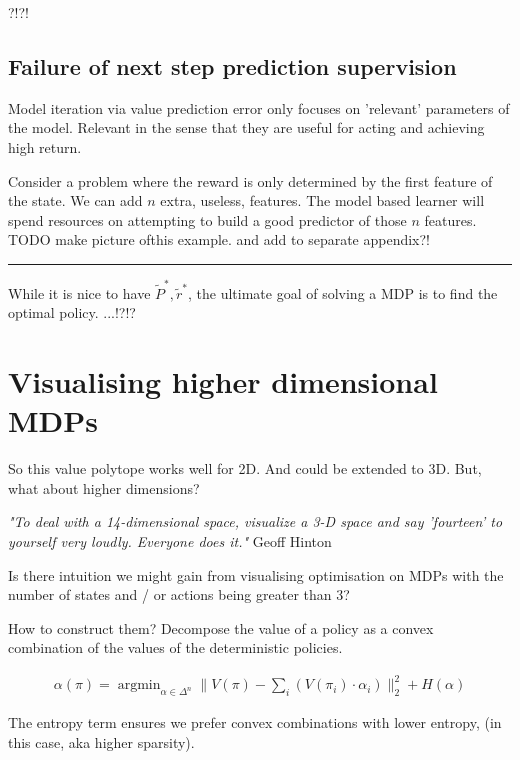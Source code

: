 ?!?!

\subsection{Failure of next step prediction supervision}

Model iteration via value prediction error only focuses on 'relevant' parameters of the model.
Relevant in the sense that they are useful for acting and achieving high return.

Consider a problem where the reward is only determined by the first feature of the state. We can add $n$ extra, useless, features.
The model based learner will spend resources on attempting to build a good predictor of those $n$ features.
{\color{red} TODO make picture ofthis example. and add to separate appendix?!}


\begin{center}\rule{0.5\linewidth}{\linethickness}\end{center}

While it is nice to have $\tilde P^{* }, \tilde r^{* }$, the ultimate goal of
solving a MDP is to find the optimal policy. ...!?!?

\newpage
\section{Visualising higher dimensional MDPs}\label{graph-vis}

So this value polytope works well for 2D. And could be extended to 3D. But, what about higher dimensions?

\begin{displayquote}
  \textit{"To deal with a 14-dimensional space, visualize a 3-D space and say 'fourteen' to yourself very loudly. Everyone does it."} Geoff Hinton
\end{displayquote}

Is there intuition we might gain from visualising optimisation on MDPs with the
number of states and / or actions being greater than 3?

How to construct them? Decompose the value of a policy as a convex combination
of the values of the deterministic policies.

\begin{align*}
  \alpha(\pi) = \mathop{\text{argmin}}_{\alpha \in \Delta^n} \parallel  V(\pi) - \sum_i (V(\pi_i) \cdot \alpha_i ) \parallel_2^2 + H(\alpha)
\end{align*}

The entropy term ensures we prefer convex combinations with lower entropy, (in this case, aka higher sparsity).

